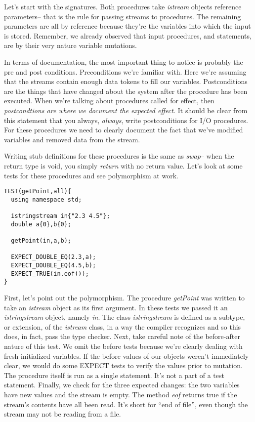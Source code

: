 \documentclass[]{tufte-handout}
\begin{document}
Let's start with the signatures. Both procedures take \textit{istream} objects reference parameters-- that is the rule for passing streams to procedures.  The remaining parameters are all by reference because they're the variables into which the input is stored. Remember, we already observed that input procedures, and statements, are by their very nature variable mutations. 

In terms of documentation, the most important thing to notice is probably the pre and post conditions. Preconditions we're familiar with. Here we're assuming that the streams contain enough data tokens to fill our variables. Postconditions are the things that have changed about the system after the procedure has been executed. When we're talking about procedures called for effect, then \textit{postcondtions are where we document the expected effect.} It should be clear from this statement that you always, \textit{always}, write postconditions for I/O procedures. For these procedures we need to clearly document the fact that we've modified variables and removed data from the stream.  

Writing stub definitions for these procedures is the same as \textit{swap}-- when the return type is void, you simply \textit{return} with no return value.  Let's look at some tests for these procedures and see polymorphism at work.
\begin{verbatim}
TEST(getPoint,all){
  using namespace std;

  istringstream in{"2.3 4.5"};
  double a{0},b{0};

  getPoint(in,a,b);
  
  EXPECT_DOUBLE_EQ(2.3,a);
  EXPECT_DOUBLE_EQ(4.5,b);
  EXPECT_TRUE(in.eof());
}  
\end{verbatim}
First, let's point out the polymorphism. The procedure \textit{getPoint} was written to take an \textit{istream} object as its first argument. In these tests we passed it an \textit{istringstream} object, namely \textit{in}. The class \textit{istringstream} is defined as a subtype, or extension, of the \textit{istream} class, in a way the compiler recognizes and so this does, in fact, pass the type checker. Next, take careful note of the before-after nature of this test. We omit the before tests because we're clearly dealing with fresh initialized variables. If the before values of our objects weren't immediately clear, we would do some EXPECT tests to verify the values prior to mutation. The procedure itself is run as a single statement. It's not a part of a test statement. Finally, we check for the three expected changes: the two variables have new values and the stream is empty. The method \textit{eof} returns true if the stream's contents have all been read. It's short for ``end of file'', even though the stream may not be reading from a file. 
\end{document}
